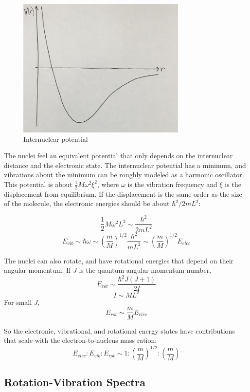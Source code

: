 \documentclass{article}
\begin{document}
\begin{figure}
    \centering
    \includegraphics[width=0.75\textwidth]{figures/722px-Min.jpg}
    \caption{Internuclear potential}
    \label{fig:int_nuc_pot}
\end{figure}

The nuclei feel an equivalent potential that only depends on the internuclear distance and the electronic state. The internuclear potential has a minimum, and vibrations about the minimum can be roughly modeled as a harmonic oscillator. This potential is about $\frac{1}{2}M\omega^2 \xi^2$, where $\omega$ is the vibration frequency and $\xi$ is the displacement from equilibrium. If the displacement is the same order as the size of the molecule, the electronic energies should be about $\hbar^2 / 2mL^2$:

$$ \frac{1}{2} M \omega^2 L^2 \sim \frac{\hbar^2}{2mL^2} $$
$$E_{vib} \sim \hbar \omega \sim \left(\frac{m}{M}\right)^{1/2} \frac{\hbar^2}{mL^2} \sim \left(\frac{m}{M}\right)^{1/2} E_{elec} $$


The nuclei can also rotate, and have rotational energies that depend on their angular momentum. If $J$ is the quantum angular momentum number, 
$$ E_{rot} \sim \frac{\hbar^2 J (J+1)}{2I} $$
$$ I \sim M L^2 $$
For small $J$, 
$$ E_{rot} \sim \frac{m}{M} E_{elec} $$

So the electronic, vibrational, and rotational energy states have contributions that scale with the electron-to-nucleus mass ration:
$$ E_{elec} : E_{vib} : E_{rot} \sim 1: \left(\frac{m}{M}\right)^{1/2} : \left(\frac{m}{M}\right) $$


\subsection{Rotation-Vibration Spectra}
\end{document}
